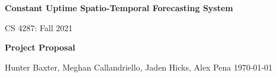 \begin{titlepage}
    \begin{center}
        \vspace*{1cm}
        
        \Huge
          \textbf{Constant Uptime Spatio-Temporal Forecasting System} %
        
        \vspace{0.5cm}
        \LARGE
        CS 4287: Fall 2021
        
        \vspace{1.5cm}
        
        \textbf{} %
   		  \vspace{1.5cm}
        
        \textbf{Project Proposal} %
       
        \vfill
        
        
        \vspace{0.8cm}
          \Large
        Hunter Baxter, Meghan Callandriello, Jaden Hicks, Alex Pena
        \vspace{0.5cm}
       \today
        
    \end{center}
\end{titlepage}